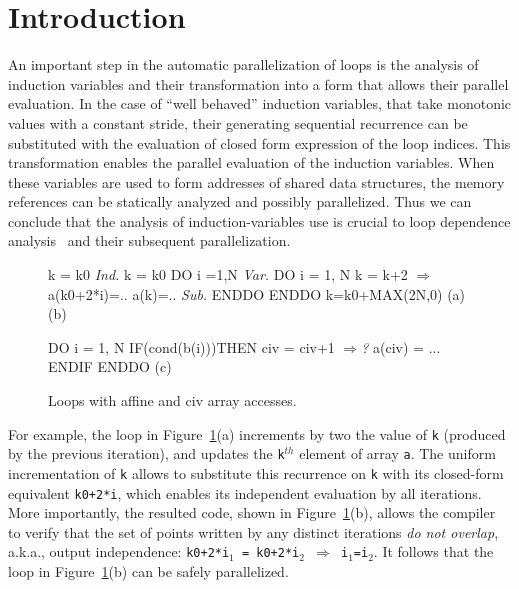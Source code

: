 \documentclass[10pt,nocopyrightspace]{sigplanconf}
\newcommand{\emp}[1]{\textcolor{DikuRed}{ #1}}
\newcommand{\emphh}[1]{\textcolor{CosGreen}{ #1}}
\newcommand{\mymath}[1]{$ #1 $}
\begin{document}


\section{Introduction}

An important step in the automatic parallelization  of loops
is the analysis of induction variables and their transformation into a
form that allows their parallel evaluation. In the case of ``well behaved''
induction variables, that take monotonic values with a constant stride,
their generating sequential recurrence can be 
substituted with the evaluation of closed form expression of the loop indices.
This transformation
enables the parallel evaluation of the induction variables. When these variables
are used to form addresses of shared data structures, the memory references
can be statically analyzed and possibly parallelized. Thus we can conclude 
that the analysis of induction-variables use is crucial %
to loop  dependence
analysis~\cite{BanerjeeIneqTest,FeautrierDataflow,Pugh92theomega} 
and their subsequent parallelization. 


% 

\begin{figure}
\begin{minipage}{0.6\columnwidth}
\begin{colorcode}
k = k0    \emphh{\em Ind.} k = k0        
DO i =1,N \emphh{\em Var.} DO i = 1, N      
  k = k+2   \emphh{\mymath{\Rightarrow}}   a(k0+2*i)=.. 
  a(k)=.. \emphh{\em Sub.} ENDDO         
ENDDO           k=k0+MAX(2N,0)
   (a)              (b) 
\end{colorcode}
\end{minipage}
\begin{minipage}{0.35\columnwidth}
\begin{colorcode}
DO i = 1, N
 IF(cond(b(i)))THEN 
    civ = civ+1 \emp{\mymath{\Rightarrow}{\em?}} 
    a(civ) = ...
ENDIF ENDDO
      (c)
\end{colorcode}
\end{minipage}
\caption{Loops with affine and {\sc civ} array accesses.}
\label{fig:introEg}
\vspace{-2ex}
\end{figure}


For example, the loop in Figure~\ref{fig:introEg}(a) increments
by two the value of {\tt k} (produced by the previous iteration),
and updates the {\tt k$^{th}$} element of array {\tt a}. 
%
The uniform incrementation of {\tt k} allows to substitute this
recurrence on {\tt k} with its closed-form equivalent {\tt k0+2*i},
which enables its independent evaluation by all iterations.
More importantly, the resulted code, shown in Figure~\ref{fig:introEg}(b),
allows the compiler to verify that the set of points written by any
distinct iterations {\em do not overlap}, a.k.a., output independence: 
{\tt k0+2*i$_1$~=~k0+2*i$_2$ $\Rightarrow$ i$_1$=i$_2$}. 
It follows that the loop in Figure~\ref{fig:introEg}(b) can be safely
parallelized. 
\end{document}
